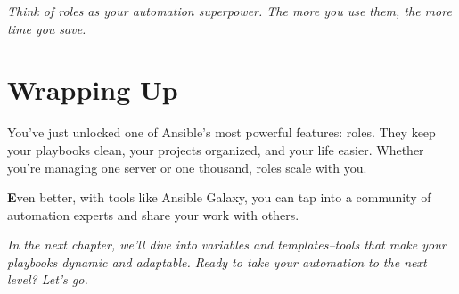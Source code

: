 \textit{Think of roles as your automation superpower. The more you use them, the more time you save.}

\section{Wrapping Up}

You've just unlocked one of Ansible's most powerful features: roles. They keep your playbooks clean, your projects organized, and your life easier. Whether you're managing one server or one thousand, roles scale with you.

\textbf{E}ven better, with tools like Ansible Galaxy, you can tap into a community of automation experts and share your work with others.
\vspace{1em}


\textit{In the next chapter, we'll dive into variables and templates--tools that make your playbooks dynamic and adaptable. Ready to take your automation to the next level? Let's go.}
